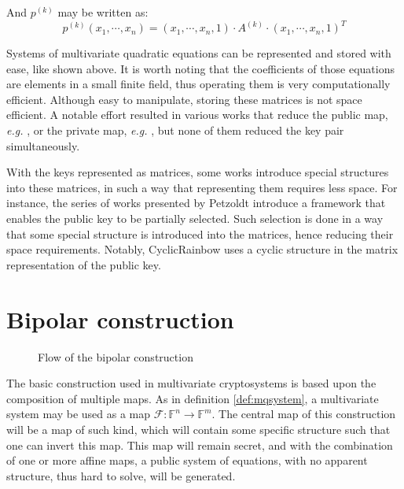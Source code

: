 \documentclass{ufsctex/ufsctex}
\begin{document}
And $p^{(k)}$ may be written as:
\begin{equation}
p^{(k)}(x_1,\cdots,x_n) =
	(x_1,\cdots,x_n,1) \cdot A^{(k)} \cdot (x_1,\cdots,x_n,1)^T
\end{equation}

Systems of multivariate quadratic equations can be represented and stored with
ease, like shown above. It is worth noting that the coefficients of those
equations are elements in a small finite field, thus operating them is very
computationally efficient. Although easy to manipulate, storing these matrices
is not space efficient. A notable effort resulted in various works that reduce
the public map, \textit{e.g.} \cite{petzoldt2010cyclicrainbow}, or the private
map, \textit{e.g.} \cite{yasuda2012reducing}, but none of them reduced the key
pair simultaneously.

With the keys represented as matrices, some works introduce special structures
into these matrices, in such a way that representing them requires less space.
For instance, the series of works presented by Petzoldt introduce a framework
that enables the public key to be partially selected. Such selection is done in
a way that some special structure is introduced into the matrices, hence
reducing their space requirements. Notably, CyclicRainbow uses a cyclic
structure in the matrix representation of the public key.

\section{Bipolar construction}

\begin{figure}
\centering
{}
\caption{Flow of the bipolar construction}\label{fig:bipolar}
\end{figure}

The basic construction used in multivariate cryptosystems is based upon the
composition of multiple maps. As in definition \ref{def:mqsystem}, a
multivariate system may be used as a map
$\mathcal{F}:\mathbb{F}^n\to\mathbb{F}^m$. The central map of this construction
will be a map of such kind, which will contain some specific structure such
that one can invert this map. This map will remain secret, and with the
combination of one or more affine maps, a public system of equations, with no
apparent structure, thus hard to solve, will be generated.
\end{document}
